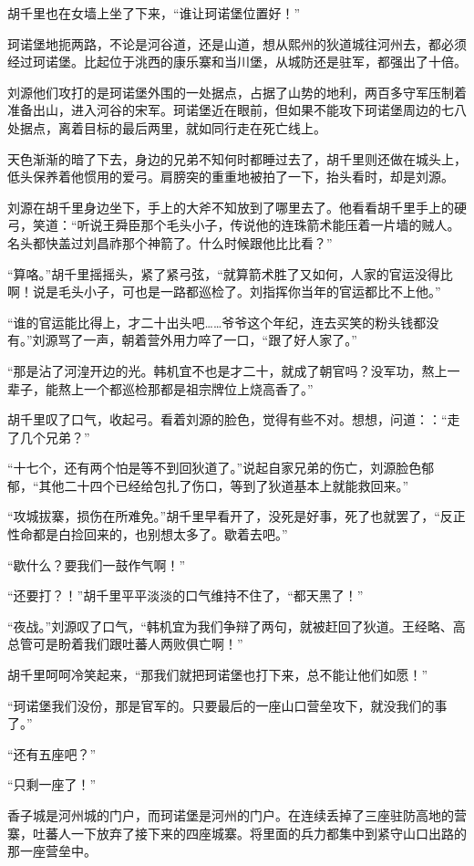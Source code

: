 胡千里也在女墙上坐了下来，“谁让珂诺堡位置好！”

珂诺堡地扼两路，不论是河谷道，还是山道，想从熙州的狄道城往河州去，都必须经过珂诺堡。比起位于洮西的康乐寨和当川堡，从城防还是驻军，都强出了十倍。

刘源他们攻打的是珂诺堡外围的一处据点，占据了山势的地利，两百多守军压制着准备出山，进入河谷的宋军。珂诺堡近在眼前，但如果不能攻下珂诺堡周边的七八处据点，离着目标的最后两里，就如同行走在死亡线上。

天色渐渐的暗了下去，身边的兄弟不知何时都睡过去了，胡千里则还做在城头上，低头保养着他惯用的爱弓。肩膀突的重重地被拍了一下，抬头看时，却是刘源。

刘源在胡千里身边坐下，手上的大斧不知放到了哪里去了。他看看胡千里手上的硬弓，笑道：“听说王舜臣那个毛头小子，传说他的连珠箭术能压着一片墙的贼人。名头都快盖过刘昌祚那个神箭了。什么时候跟他比比看？”

“算咯。”胡千里摇摇头，紧了紧弓弦，“就算箭术胜了又如何，人家的官运没得比啊！说是毛头小子，可也是一路都巡检了。刘指挥你当年的官运都比不上他。”

“谁的官运能比得上，才二十出头吧……爷爷这个年纪，连去买笑的粉头钱都没有。”刘源骂了一声，朝着营外用力啐了一口，“跟了好人家了。”

“那是沾了河湟开边的光。韩机宜不也是才二十，就成了朝官吗？没军功，熬上一辈子，能熬上一个都巡检那都是祖宗牌位上烧高香了。”

胡千里叹了口气，收起弓。看着刘源的脸色，觉得有些不对。想想，问道：：“走了几个兄弟？”

“十七个，还有两个怕是等不到回狄道了。”说起自家兄弟的伤亡，刘源脸色郁郁，“其他二十四个已经给包扎了伤口，等到了狄道基本上就能救回来。”

“攻城拔寨，损伤在所难免。”胡千里早看开了，没死是好事，死了也就罢了，“反正性命都是白捡回来的，也别想太多了。歇着去吧。”

“歇什么？要我们一鼓作气啊！”

“还要打？！”胡千里平平淡淡的口气维持不住了，“都天黑了！”

“夜战。”刘源叹了口气，“韩机宜为我们争辩了两句，就被赶回了狄道。王经略、高总管可是盼着我们跟吐蕃人两败俱亡啊！”

胡千里呵呵冷笑起来，“那我们就把珂诺堡也打下来，总不能让他们如愿！”

“珂诺堡我们没份，那是官军的。只要最后的一座山口营垒攻下，就没我们的事了。”

“还有五座吧？”

“只剩一座了！”

香子城是河州城的门户，而珂诺堡是河州的门户。在连续丢掉了三座驻防高地的营寨，吐蕃人一下放弃了接下来的四座城寨。将里面的兵力都集中到紧守山口出路的那一座营垒中。

